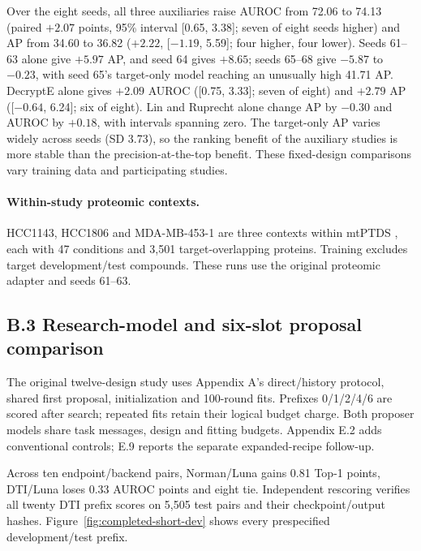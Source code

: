 Over the eight seeds, all three auxiliaries raise AUROC from 72.06 to 74.13 (paired $+2.07$ points, 95\% interval [0.65, 3.38]; seven of eight seeds higher) and AP from 34.60 to 36.82 ($+2.22$, [$-1.19$, 5.59]; four higher, four lower). Seeds 61--63 alone give $+5.97$ AP, and seed 64 gives $+8.65$; seeds 65--68 give $-5.87$ to $-0.23$, with seed 65's target-only model reaching an unusually high 41.71 AP. DecryptE alone gives $+2.09$ AUROC ([0.75, 3.33]; seven of eight) and $+2.79$ AP ([$-0.64$, 6.24]; six of eight). Lin and Ruprecht alone change AP by $-0.30$ and AUROC by $+0.18$, with intervals spanning zero. The target-only AP varies widely across seeds (SD 3.73), so the ranking benefit of the auxiliary studies is more stable than the precision-at-the-top benefit. These fixed-design comparisons vary training data and participating studies.

\paragraph{Within-study proteomic contexts.}
HCC1143, HCC1806 and MDA-MB-453-1 are three contexts within mtPTDS \citep{Sun2026ProteinTalks}, each with 47 conditions and 3,501 target-overlapping proteins. Training excludes target development/test compounds. These runs use the original proteomic adapter and seeds 61--63.



\subsection*{B.3 Research-model and six-slot proposal comparison}
The original twelve-design study uses Appendix A's direct/history protocol, shared first proposal, initialization and 100-round fits. Prefixes 0/1/2/4/6 are scored after search; repeated fits retain their logical budget charge. Both proposer models share task messages, design and fitting budgets. Appendix E.2 adds conventional controls; E.9 reports the separate expanded-recipe follow-up.



Across ten endpoint/backend pairs, Norman/Luna gains 0.81 Top-1 points, DTI/Luna loses 0.33 AUROC points and eight tie. Independent rescoring verifies all twenty DTI prefix scores on 5,505 test pairs and their checkpoint/output hashes. Figure~\ref{fig:completed-short-dev} shows every prespecified development/test prefix.

